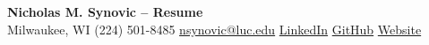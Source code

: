 \documentclass[11pt,letterpaper]{article}
\begin{document}
\begin{center}
    {\LARGE\bfseries Nicholas M. Synovic -- Resume}\\[6pt]
    {\small
        Milwaukee, WI\contactsep
        (224) 501-8485\contactsep
        \href{mailto:nsynovic@luc.edu}{nsynovic@luc.edu}\contactsep
        \href{https://www.linkedin.com/in/nsynovic}{LinkedIn}\contactsep
        \href{https://github.com/NicholasSynovic}{GitHub}\contactsep
        \href{https://nicholassynovic.github.io/}{Website}
    }
\end{center}





\end{document}
